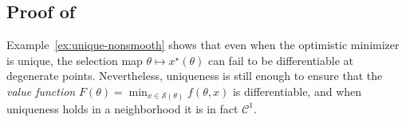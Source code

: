\documentclass{article}
\theoremstyle{normaltheorem}
\newcommand{\R}{\mathbb{R}}
\newcommand{\calS}{\mathcal{S}}
\begin{document}



\subsection{Proof of }\label{append:F-diff-unique}
		Example~\ref{ex:unique-nonsmooth} shows that even when the optimistic minimizer is unique,
		the selection map $\theta\mapsto x^\star(\theta)$ can fail to be differentiable at degenerate points.
		Nevertheless, uniqueness is still enough to ensure that the \emph{value function}
		$F(\theta)=\min_{x\in\calS(\theta)}f(\theta,x)$ is differentiable, and when uniqueness holds in a neighborhood it is in fact $\mathcal{C}^{1}$.
\end{document}
